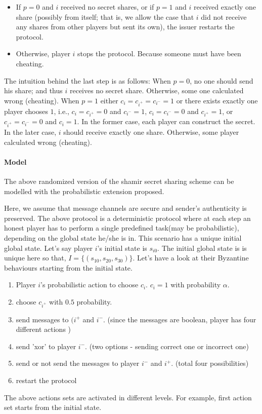 \begin{enumerate}
\begin{itemize}
\item If $p =0$ and $i$ received no secret shares, or if $p =1$ and $i$ received exactly one share (possibly from itself; that is, we allow the case that $i$ did not receive any shares from other players but sent its own), the issuer restarts the protocol. 
\item Otherwise, player $i$ stops the protocol. Because someone must have been cheating. 
\end{itemize}
The intuition behind the last step is as follows: When $p=0$, no one should send his share; and thus $i$ receives no secret share. Otherwise, some one calculated wrong (cheating).
When $p=1$ either $c_i=c_{i^+}=c_{i^-}=1$ or there exists exactly one player chooses $1$, i.e., $c_i=c_{i^+}=0$ and $c_{i^-}=1$, $c_i=c_{i^-}=0$ and $c_{i^+}=1$, or $c_{i^+}=c_{i^-}=0$ and $c_i=1$. 
In the former case, each player can construct the secret. In the later case, $i$ should receive exactly one share. Otherwise, some player calculated wrong (cheating). 
\end{enumerate}

\paragraph{Model}
The above randomized version of the shamir secret sharing scheme can be modelled with the probabilistic extension proposed.\newline

Here, we assume that message channels are secure and sender's authenticity is preserved.
The above protocol is a deterministic protocol where at each step an honest player has to perform a single predefined task(may be probabilistic), depending on the global state he/she is in. This scenario has a unique initial global state. Let's say player $i$'s initial state is $s_{i0}$. The initial global state is is unique here so that, $I=\{(s_{10},s_{20},s_{30}) \}$.
Let's have a look at their Byzantine behaviours starting from the initial state.
 
 \begin{enumerate}
 	\item Player $i$'s probabilistic action to choose $c_i$. $c_i=1$ with probability $\alpha$. 
 	\item choose $c_{i^+}$ with $0.5$ probability.
 	\item send messages to $(i^{+}$ and $i^{-}$. (since the messages are boolean, player has four different actions )
 	\item send 'xor' to player $i^{-}$. (two options - sending correct one or incorrect one)
 	\item send or not send the messages to player $i^-$ and $i^+$. (total four possibilities)
 	\item restart the protocol
 \end{enumerate}
 The above actions sets are activated in different levels. For example, first action set starts from the initial state.
 
